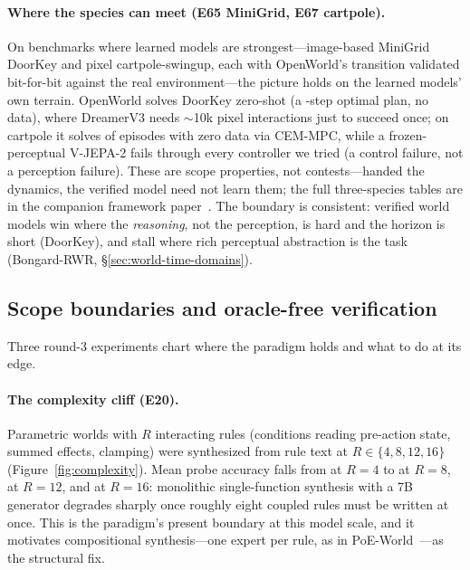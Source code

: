 \documentclass[11pt]{article}
\begin{document}
\paragraph{Where the species can meet (E65 MiniGrid, E67 cartpole).}\label{sec:minigrid}\label{sec:cartpole}
On benchmarks where learned models are strongest---image-based MiniGrid DoorKey and pixel
cartpole-swingup, each with OpenWorld's transition validated bit-for-bit against the real
environment---the picture holds on the learned models' own terrain. OpenWorld solves DoorKey
zero-shot (a \MGOpenWorldPlan-step optimal plan, no data), where DreamerV3 needs $\sim$10k pixel
interactions just to succeed once; on cartpole it solves \CartOpenWorldSolve{} of episodes with
zero data via CEM-MPC, while a frozen-perceptual V-JEPA-2 fails through every controller we tried (a
control failure, not a perception failure). These are scope properties, not contests---handed the
dynamics, the verified model need not learn them; the full three-species tables are in the companion
framework paper~\cite{openworld_framework}. The boundary is consistent: verified world models win
where the \emph{reasoning}, not the perception, is hard and the horizon is short (DoorKey), and stall
where rich perceptual abstraction is the task (Bongard-RWR, \S\ref{sec:world-time-domains}).

\subsection{Scope boundaries and oracle-free verification}\label{sec:boundaries}
Three round-3 experiments chart where the paradigm holds and what to do at
its edge.

\paragraph{The complexity cliff (E20).} Parametric worlds with $R$
interacting rules (conditions reading pre-action state, summed effects,
clamping) were synthesized from rule text at $R \in \{4, 8, 12, 16\}$
(Figure~\ref{fig:complexity}). Mean probe accuracy falls from \CplxFour{} at
$R{=}4$ to \CplxEight{} at $R{=}8$, \CplxTwelve{} at $R{=}12$, and
\CplxSixteen{} at $R{=}16$: monolithic single-function synthesis with a 7B
generator degrades sharply once roughly eight coupled rules must be
written at once. This is the paradigm's present boundary at this model
scale, and it motivates compositional synthesis---one expert per rule, as in
PoE-World~\cite{poeworld2025}---as the structural fix.
\end{document}
